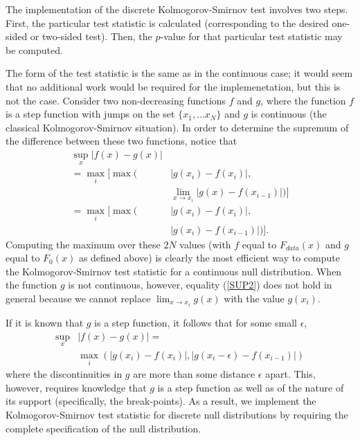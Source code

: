 The implementation of the discrete Kolmogorov-Smirnov test involves
two steps. First, the particular test statistic is calculated
(corresponding to the desired one-sided or two-sided test).
Then, the $p$-value for that particular test statistic may be computed. 

The form of the test statistic is the same as in the
continuous case; it would seem that no additional work would be required
for the implemenetation, but this is not the case.
Consider two non-decreasing functions $f$ and $g$, where the function $f$ is a step function with jumps on the set $\{x_1, \ldots x_N \}$ and $g$
is continuous (the classical Kolmogorov-Smirnov situation).
In order to determine the supremum of the difference between
these two functions, notice that
\begin{align}
\sup_x \left| f(x) - g(x) \right| &  \nonumber  \\
       =  \max_i \bigg[ \max\bigg(  & \left|g(x_i) - f(x_i) \right|, \nonumber \\
& \lim_{x \rightarrow x_i} \left| g(x) - f(x_{i-1})
   \right| \bigg) \bigg] \label{SUP1}\\
=  \max_i \bigg[\max \bigg( & \left|g(x_i) - f(x_i) \right|, \nonumber \\
& \left| g(x_i) - f(x_{i-1}) \right| \bigg) \bigg]. \label{SUP2}
\end{align}
Computing the maximum over these $2N$
values (with $f$ equal to
$F_{data}(x)$ and $g$ equal to $F_0(x)$ as defined above) is clearly the 
most efficient way to compute the Kolmogorov-Smirnov test statistic for
a continuous null distribution. When the function $g$ is not
continuous, however, equality (\ref{SUP2}) does not hold in general because 
we cannot replace $\lim_{x\rightarrow x_i} g(x)$ with the value $g(x_i)$. 

If it is known that $g$ is a step function, it follows that
for some small $\epsilon$,
\begin{align}
\sup_x &\left| f(x)- g(x) \right| =  \nonumber \\
        & \max_i \left( \left|g(x_i) - f(x_i) \right|, 
    \left| g(x_i - \epsilon) - f(x_{i-1}) \right| \right) \label{epsilon}
\end{align}
where the discontinuities in $g$ are more than some distance $\epsilon$ apart. 
This, however, requires knowledge that $g$ is a step function as well as of
the nature of its support (specifically, the break-points).  As a result,
we implement the Kolmogorov-Smirnov test statistic for discrete null
distributions by requiring the complete specification of the null distribution.

